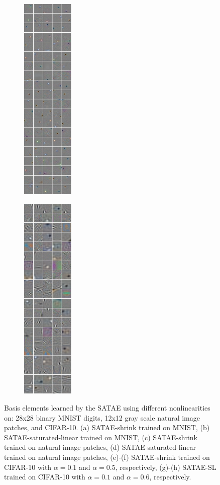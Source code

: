{\begin{figure}
\begin{subfigure}[b]{0.2\textwidth}
\includegraphics[width=2.5cm, height=10cm]{./figures/SATAE/CIFAR_sat_linear300_1.png}
\caption{} \end{subfigure} \begin{subfigure}[b]{0.2\textwidth} \centering
\includegraphics[width=2.5cm, height=10cm]{./figures/SATAE/CIFAR_sat_linear300_6.png}
\caption{} \end{subfigure} \caption{\small Basis elements learned by the SATAE using
different nonlinearities on: 28x28 binary MNIST digits, 12x12 gray scale
natural image patches, and CIFAR-10. (a) SATAE-shrink trained on MNIST, (b)
SATAE-saturated-linear trained on MNIST, (c) SATAE-shrink trained on natural
image patches, (d) SATAE-saturated-linear trained on natural image patches,
(e)-(f) SATAE-shrink trained on CIFAR-10 with $\alpha=0.1$ and $\alpha=0.5$,
respectively, (g)-(h) SATAE-SL trained on CIFAR-10 with $\alpha=0.1$ and
$\alpha=0.6$, respectively.  } \label{fig:results} \end{figure}
\clearpage} 

